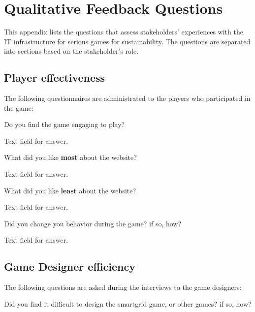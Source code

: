 \chapter{Qualitative Feedback Questions}
\label{app:qualitative-feedback}

This appendix lists the questions that assess stakeholders' experiences with the IT infrastructure for serious games for sustainability. The questions are separated into sections based on the stakeholder's role.

\section{Player effectiveness}

The following questionnaires are administrated to the players who participated in the game:

\begin{question}
	\item Do you find the game engaging to play?
\end{question}

Text field for answer.

\begin{question}
	\item What did you like \textbf{most} about the website?
\end{question}

Text field for answer.

\begin{question}
	\item What did you like \textbf{least} about the website?
\end{question}

Text field for answer.

\begin{question}
	\item Did you change you behavior during the game? if so, how?
\end{question}

Text field for answer.

\section{Game Designer efficiency}

The following questions are asked during the interviews to the game designers:

\begin{question}
	\item Did you find it difficult to design the smartgrid game, or other games? if so, how?
\end{question}

